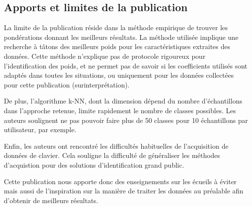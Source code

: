 \subsection{Apports et limites de la publication}
La limite de la publication réside dans la méthode empirique de trouver les pondérations donnant les meilleurs résultats. La méthode utilisée implique une recherche à tâtons des meilleurs poids pour les caractéristiques extraites des données. Cette méthode n'explique pas de protocole rigoureux pour l'identification des poids, et ne permet pas de savoir si les coefficients utilisés sont adaptés dans toutes les situations, ou uniquement pour les données collectées pour cette publication (surinterprétation).

De plus, l'algorithme k-NN, dont la dimension dépend du nombre d'échantillons dans l'approche retenue, limite rapidement le nombre de classes possibles. Les auteurs soulignent ne pas pouvoir faire plus de 50 classes pour 10 échantillons par utilisateur, par exemple. 

Enfin, les auteurs ont rencontré les difficultés habituelles de l'acquisition de données de clavier. Cela souligne la difficulté de généraliser les méthodes d'acquistion pour des solutions d'identification grand public.

Cette publication nous apporte donc des enseignements sur les écueils à éviter mais aussi de l'inspiration sur la manière de traiter les données au préalable afin d'obtenir de meilleurs résultats.

